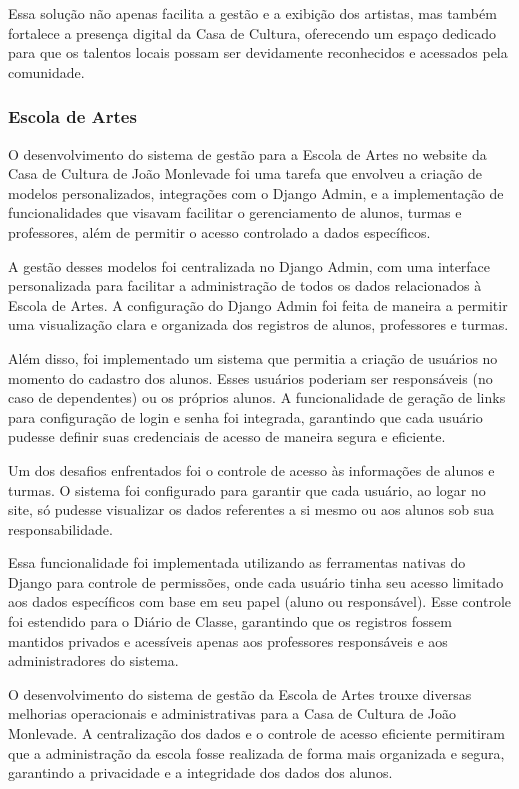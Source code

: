 Essa solução não apenas facilita a gestão e a exibição dos artistas, mas também fortalece a presença digital da Casa de Cultura, oferecendo um espaço dedicado para que os talentos locais possam ser devidamente reconhecidos e acessados pela comunidade.

\subsubsection{Escola de Artes}

O desenvolvimento do sistema de gestão para a Escola de Artes no website da Casa de Cultura de João Monlevade foi uma tarefa que envolveu a criação de modelos personalizados, integrações com o Django Admin, e a implementação de funcionalidades que visavam facilitar o gerenciamento de alunos, turmas e professores, além de permitir o acesso controlado a dados específicos.


A gestão desses modelos foi centralizada no Django Admin, com uma interface personalizada para facilitar a administração de todos os dados relacionados à Escola de Artes. A configuração do Django Admin foi feita de maneira a permitir uma visualização clara e organizada dos registros de alunos, professores e turmas.

Além disso, foi implementado um sistema que permitia a criação de usuários no momento do cadastro dos alunos. Esses usuários poderiam ser responsáveis (no caso de dependentes) ou os próprios alunos. A funcionalidade de geração de links para configuração de login e senha foi integrada, garantindo que cada usuário pudesse definir suas credenciais de acesso de maneira segura e eficiente.

Um dos desafios enfrentados foi o controle de acesso às informações de alunos e turmas. O sistema foi configurado para garantir que cada usuário, ao logar no site, só pudesse visualizar os dados referentes a si mesmo ou aos alunos sob sua responsabilidade.

Essa funcionalidade foi implementada utilizando as ferramentas nativas do Django para controle de permissões, onde cada usuário tinha seu acesso limitado aos dados específicos com base em seu papel (aluno ou responsável). Esse controle foi estendido para o Diário de Classe, garantindo que os registros fossem mantidos privados e acessíveis apenas aos professores responsáveis e aos administradores do sistema.

O desenvolvimento do sistema de gestão da Escola de Artes trouxe diversas melhorias operacionais e administrativas para a Casa de Cultura de João Monlevade. A centralização dos dados e o controle de acesso eficiente permitiram que a administração da escola fosse realizada de forma mais organizada e segura, garantindo a privacidade e a integridade dos dados dos alunos.

